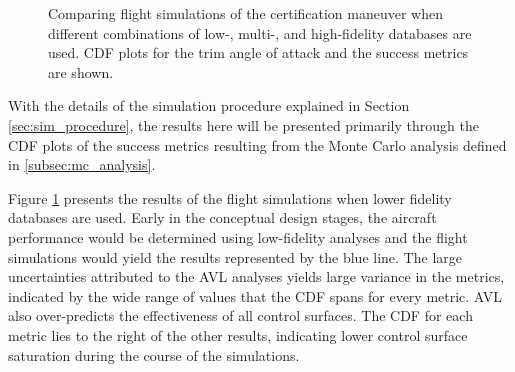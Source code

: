 \begin{figure}
    \centering
    \begin{subfigure}[CDF for the trim $\alpha$]{
        \texttt{[image: code/image\_gen/cba/Stanford\_CFR25\_147d\_2\_R2/images/trim\_aoa\_sf\_vs\_mf.png]} 
        \label{subfig:sf_vs_mf_trim_cdf}
    } 
    \end{subfigure}
    \hfill
    \begin{subfigure}[CDF for the pitch metric]{
        \texttt{[image: code/image\_gen/cba/Stanford\_CFR25\_147d\_2\_R2/images/reo\_pitch\_sf\_vs\_mf.png]} 
        \label{subfig:sf_vs_mf_pitch_cdf}
    } 
    \end{subfigure}
    \hfill
    \begin{subfigure}[CDF for the roll metric]{
        \texttt{[image: code/image\_gen/cba/Stanford\_CFR25\_147d\_2\_R2/images/reo\_roll\_sf\_vs\_mf.png]} 
        \label{subfig:sf_vs_mf_roll_cdf}
    } 
    \end{subfigure}
    \hfill
    \begin{subfigure}[CDF for the yaw metric]{
        \texttt{[image: code/image\_gen/cba/Stanford\_CFR25\_147d\_2\_R2/images/reo\_yaw\_sf\_vs\_mf.png]} 
        \label{subfig:sf_vs_mf_yaw_cdf}
    } 
    \end{subfigure}
    \caption{Comparing flight simulations of the certification maneuver when different combinations of low-, multi-, and high-fidelity databases are used. CDF plots for the trim angle of attack and the success metrics are shown. \label{fig:sf_vs_mf_metric_cdfs}}
\end{figure}

With the details of the simulation procedure explained in Section \ref{sec:sim_procedure}, the results here will be presented primarily through the CDF plots of the success metrics resulting from the Monte Carlo analysis defined in \ref{subsec:mc_analysis}.

Figure \ref{fig:sf_vs_mf_metric_cdfs} presents the results of the flight simulations when lower fidelity databases are used.
Early in the conceptual design stages, the aircraft performance would be determined using low-fidelity analyses and the flight simulations would yield the results represented by the blue line. 
The large uncertainties attributed to the AVL analyses yields large variance in the metrics, indicated by the wide range of values that the CDF spans for every metric. 
AVL also over-predicts the effectiveness of all control surfaces.
The CDF for each metric lies to the right of the other results, indicating lower control surface saturation during the course of the simulations. 

